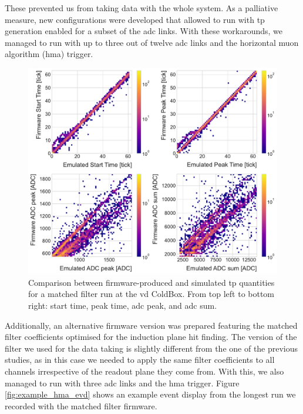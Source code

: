 These prevented us from taking data with the whole system. As a palliative measure, new configurations were developed that allowed to run with \gls{tp} generation enabled for a subset of the \gls{adc} links. With these workarounds, we managed to run with up to three out of twelve \gls{adc} links and the horizontal muon algorithm (\gls{hma}) trigger.

\begin{figure}[t]
    \centering
    \includegraphics[scale = 0.5]{Images/Matched_Filter/np02_coldbox_tp_comp.pdf}
    \caption[Comparison between firmware-produced and simulated \gls{tp} quantities for a matched filter run at the \gls{vd} ColdBox.]{Comparison between firmware-produced and simulated \gls{tp} quantities for a matched filter run at the \gls{vd} ColdBox. From top left to bottom right: start time, peak time, \gls{adc} peak, and \gls{adc} sum.}
    \label{fig:vdcoldbox_tp_comp}
\end{figure}

Additionally, an alternative firmware version was prepared featuring the matched filter coefficients optimised for the induction plane hit finding. The version of the filter we used for the data taking is slightly different from the one of the previous studies, as in this case we needed to apply the same filter coefficients to all channels irrespective of the readout plane they come from. With this, we also managed to run with three \gls{adc} links and the \gls{hma} trigger. Figure \ref{fig:example_hma_evd} shows an example event display from the longest run we recorded with the matched filter firmware.

